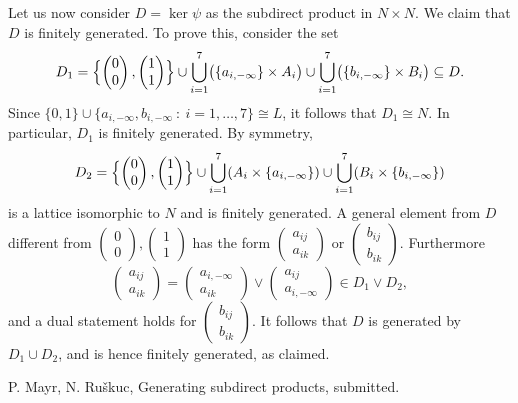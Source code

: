 \documentclass[12pt]{amsart}
\newcommand{\join}{\vee}
\newcommand{\sdp}[2]{\begin{pmatrix} #1\\ #2\end{pmatrix}}
\begin{document}
Let us now consider $D=\ker \psi$ as the subdirect product in $N\times N$.
We claim that $D$ is finitely generated. To prove this, consider the set
\[
D_1=\Bigl\{ \sdp{0}{0},\sdp{1}{1}\Bigr\} \cup
\bigcup_{i=1}^7 \bigl(\{a_{i,-\infty}\}\times A_i\bigr)\cup\bigcup_{i=1}^7 \bigl(\{b_{i,-\infty}\}\times B_i\bigr)
\subseteq D.
\]
Since
$\{ 0,1\}\cup\{a_{i,-\infty},b_{i,-\infty}\::\: i=1,\dots,7\}\cong L$,
it follows that $D_1\cong N$. In particular, $D_1$ is finitely generated.
By symmetry, 
\[
D_2=\Bigl\{ \sdp{0}{0},\sdp{1}{1}\Bigr\} \cup
\bigcup_{i=1}^7 (A_i\times \{a_{i,-\infty}\})\cup\bigcup_{i=1}^7 (B_i\times \{b_{i,-\infty}\})
\]
is a lattice isomorphic to $N$ and is finitely generated.
A general element from $D$ different from $\sdp{0}{0},\sdp{1}{1}$ has the form
$\sdp{a_{ij}}{a_{ik}}$ or $\sdp{b_{ij}}{b_{ik}}$. Furthermore
\[
\sdp{a_{ij}}{a_{ik}} = \sdp{a_{i,-\infty}}{a_{ik}}\join \sdp{a_{ij}}{a_{i,-\infty}}\in D_1\join D_2,
\]
and a dual statement holds for $\sdp{b_{ij}}{b_{ik}}$.
It follows that $D$ is generated by $D_1\cup D_2$, and is hence finitely generated, as claimed.


\begin{thebibliography}{9}
P. Mayr, N. Ru\v{s}kuc, Generating subdirect products, submitted.
\end{thebibliography}
\end{document}
